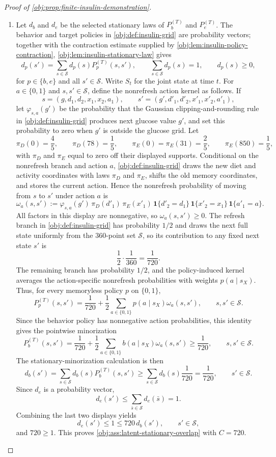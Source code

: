 \begin{proof}[Proof of \cref{obj:prop:finite-insulin-demonstration}]
\begin{enumerate}
\item Let \(d_b\) and \(d_e\) be the selected stationary laws of \(P_b^{(T)}\) and \(P_e^{(T)}\). The behavior and target policies in \cref{obj:def:insulin-grid} are probability vectors; together with the contraction estimate supplied by \cref{obj:lem:insulin-policy-contraction}, \cref{obj:lem:insulin-stationary-law} gives
\[
d_p(s')
=
\sum_{s\in\mathcal S}d_p(s)P_p^{(T)}(s,s'),
\qquad
\sum_{s\in\mathcal S}d_p(s)=1,
\qquad
 d_p(s)\ge0,
\]
for \(p\in\{b,e\}\) and all \(s'\in\mathcal S\).
Write \(S_t\) for the joint state at time \(t\). For \(a\in\{0,1\}\) and \(s,s'\in\mathcal S\), define the nonrefresh action kernel as follows. If
\[
s=(g,d_1,d_2,x_1,x_2,a_1),
\qquad
s'=(g',d'_1,d'_2,x'_1,x'_2,a'_1),
\]
let \(\varphi_{s,a}(g')\) be the probability that the Gaussian clipping-and-rounding rule in \cref{obj:def:insulin-grid} produces next glucose value \(g'\), and set this probability to zero when \(g'\) is outside the glucose grid. Let
\[
\pi_D(0)=\frac45,
\qquad
\pi_D(78)=\frac15,
\qquad
\pi_E(0)=\pi_E(31)=\frac25,
\qquad
\pi_E(850)=\frac15,
\]
with \(\pi_D\) and \(\pi_E\) equal to zero off their displayed supports. Conditional on the nonrefresh branch and action \(a\), \cref{obj:def:insulin-grid} draws the new diet and activity coordinates with laws \(\pi_D\) and \(\pi_E\), shifts the old memory coordinates, and stores the current action. Hence the nonrefresh probability of moving from \(s\) to \(s'\) under action \(a\) is
\[
\omega_a(s,s')
:=
\varphi_{s,a}(g')\,\pi_D(d'_1)\,\pi_E(x'_1)\,
\mathbf 1\{d'_2=d_1\}\,
\mathbf 1\{x'_2=x_1\}\,
\mathbf 1\{a'_1=a\}.
\]
All factors in this display are nonnegative, so \(\omega_a(s,s')\ge0\). The refresh branch in \cref{obj:def:insulin-grid} has probability \(1/2\) and draws the next full state uniformly from the \(360\)-point set \(\mathcal S\), so its contribution to any fixed next state \(s'\) is
\[
\frac12\cdot\frac1{360}=\frac1{720}.
\]
The remaining branch has probability \(1/2\), and the policy-induced kernel averages the action-specific nonrefresh probabilities with weights \(p(a\mid s_X)\). Thus, for every memoryless policy \(p\) on \(\{0,1\}\),
\[
P_p^{(T)}(s,s')
=
\frac1{720}
+
\frac12\sum_{a\in\{0,1\}}p(a\mid s_X)\omega_a(s,s'),
\qquad s,s'\in\mathcal S .
\]
Since the behavior policy has nonnegative action probabilities, this identity gives the pointwise minorization
\[
P_b^{(T)}(s,s')
=
\frac1{720}
+\frac12\sum_{a\in\{0,1\}}b(a\mid s_X)\omega_a(s,s')
\ge
\frac1{720},
\qquad s,s'\in\mathcal S .
\]
The stationary-minorization calculation is then
\[
d_b(s')
=
\sum_{s\in\mathcal S}d_b(s)P_b^{(T)}(s,s')
\ge
\sum_{s\in\mathcal S}d_b(s)\frac1{720}
=
\frac1{720},
\qquad s'\in\mathcal S .
\]
Since \(d_e\) is a probability vector,
\[
d_e(s')\le\sum_{\bar s\in\mathcal S}d_e(\bar s)=1.
\]
Combining the last two displays yields
\[
d_e(s')\le 1\le 720\,d_b(s'),
\qquad s'\in\mathcal S,
\]
and \(720\ge1\). This proves \cref{obj:ass:latent-stationary-overlap} with \(C=720\). %


\end{enumerate}
\end{proof}
